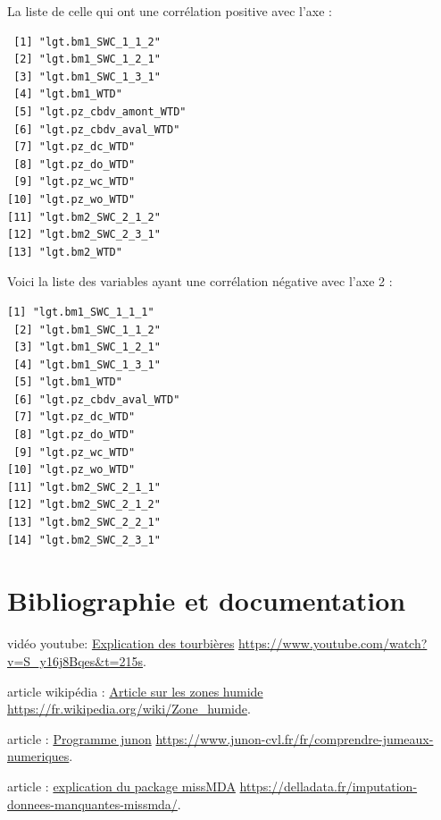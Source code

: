 \documentclass[a4paper,12pt]{report}%
\begin{document}
La liste de celle qui ont une corrélation positive avec l'axe : 
\begin{lstlisting}
 [1] "lgt.bm1_SWC_1_1_2"    
 [2] "lgt.bm1_SWC_1_2_1"    
 [3] "lgt.bm1_SWC_1_3_1"    
 [4] "lgt.bm1_WTD"          
 [5] "lgt.pz_cbdv_amont_WTD"
 [6] "lgt.pz_cbdv_aval_WTD" 
 [7] "lgt.pz_dc_WTD"        
 [8] "lgt.pz_do_WTD"        
 [9] "lgt.pz_wc_WTD"        
[10] "lgt.pz_wo_WTD"        
[11] "lgt.bm2_SWC_2_1_2"    
[12] "lgt.bm2_SWC_2_3_1"    
[13] "lgt.bm2_WTD" 
\end{lstlisting}

Voici la liste des variables ayant une corrélation négative avec l'axe 2 : 
\begin{lstlisting}
[1] "lgt.bm1_SWC_1_1_1"   
 [2] "lgt.bm1_SWC_1_1_2"   
 [3] "lgt.bm1_SWC_1_2_1"   
 [4] "lgt.bm1_SWC_1_3_1"   
 [5] "lgt.bm1_WTD"         
 [6] "lgt.pz_cbdv_aval_WTD"
 [7] "lgt.pz_dc_WTD"       
 [8] "lgt.pz_do_WTD"       
 [9] "lgt.pz_wc_WTD"       
[10] "lgt.pz_wo_WTD"       
[11] "lgt.bm2_SWC_2_1_1"   
[12] "lgt.bm2_SWC_2_1_2"   
[13] "lgt.bm2_SWC_2_2_1"   
[14] "lgt.bm2_SWC_2_3_1" 
\end{lstlisting}
\clearpage
\chapter*{Bibliographie et documentation}

vidéo youtube: \href{https://www.youtube.com/watch?v=S_y16j8Bqes&t=215s}{Explication des tourbières} \newline
 \url{https://www.youtube.com/watch?v=S_y16j8Bqes&t=215s}.\newline

article wikipédia : \href{https://fr.wikipedia.org/wiki/Zone_humide}{Article sur les zones humide} \newline 
 \url{https://fr.wikipedia.org/wiki/Zone_humide}.\newline

article : \href{https://www.junon-cvl.fr/fr/comprendre-jumeaux-numeriques}{Programme junon} \newline 
 \url{https://www.junon-cvl.fr/fr/comprendre-jumeaux-numeriques}.\newline

article : \href{https://delladata.fr/imputation-donnees-manquantes-missmda/}{explication du package missMDA} \newline
\url{https://delladata.fr/imputation-donnees-manquantes-missmda/}.\newline
\end{document}
